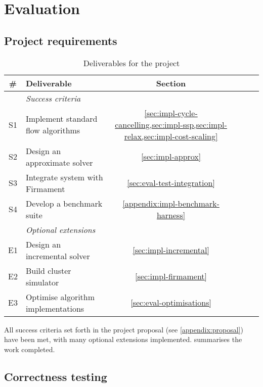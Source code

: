 \chapter{Evaluation} \label{chap:eval}


\section{Project requirements} 

\begin{table}
    \centering
    \begin{tabular}{clcccc}
        \textbf{\#} & \textbf{Deliverable} & \textbf{Section}
        \tabularnewline
        \hline
        & \textit{Success criteria} \tabularnewline
        S1 & Implement standard flow algorithms & \cref{sec:impl-cycle-cancelling,sec:impl-ssp,sec:impl-relax,sec:impl-cost-scaling} \tabularnewline
        S2 & Design an approximate solver & \cref{sec:impl-approx} \tabularnewline
        S3 & Integrate system with Firmament & \cref{sec:eval-test-integration} \tabularnewline
        S4 & Develop a benchmark suite & \cref{appendix:impl-benchmark-harness} \tabularnewline
        \hline
        & \textit{Optional extensions} \tabularnewline
        E1 & Design an incremental solver & \cref{sec:impl-incremental} \tabularnewline
        E2 & Build cluster simulator & \cref{sec:impl-firmament} \tabularnewline
        E3 & Optimise algorithm implementations & \cref{sec:eval-optimisations} \tabularnewline
        \hline
    \end{tabular}
    \crefsections
    \caption{Deliverables for the project}
    \label{table:eval-project-requirements}
\end{table}

All success criteria set forth in the project proposal (see \cref{appendix:proposal}) have been met, with many optional extensions implemented.  summarises the work completed.


\section{Correctness testing}


